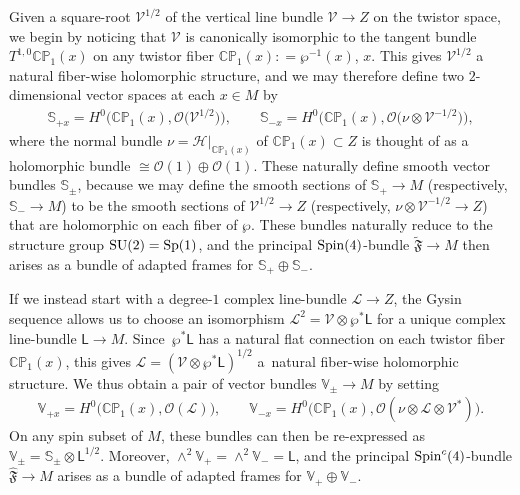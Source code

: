 \documentclass[pdftex]{sigma}
\numberwithin{equation}{section}
\def\CP{\mathbb{CP}}
\begin{document}
Given a square-root $\mathscr{V}^{1/2}$ of the vertical line bundle $\mathscr{V}\to Z$ on the twistor space,
we begin by noticing that $\mathscr{V}$ is canonically isomorphic to the tangent bundle $T^{1,0} \CP_1(x)$
on any twistor fiber $\CP_1 (x) : = \wp^{-1} (x)$, $x$. This gives $\mathscr{V}^{1/2}$ a natural fiber-wise
holomorphic structure, and we may therefore define two $2$-dimensional vector spaces at each $x\in M$ by
\begin{gather*}
{ \mathbb{S}}_{+{ x}}= H^0 \big({ \CP_{1}}({ x}) , \mathcal{O} \big(\mathscr{V}^{1/2}\big) \big), \qquad
{ \mathbb{S}}_{-{ x}}= H^0 \big({ \CP_{1}}({ x}) , \mathcal{O} \big({ \nu} \otimes \mathscr{V}^{-1/2}\big)\big),
\end{gather*}
where the normal bundle $\nu = \mathscr{H}|_{\CP_1 (x)}$ of $\CP_1(x) \subset Z$ is thought of as a holomorphic bundle $\cong \mathcal{O}(1) \oplus \mathcal{O}(1) $.
These naturally define smooth vector bundles $\mathbb{S}_\pm$, because we
may define the smooth sections of $\mathbb{S}_+\to M$ (respectively, $\mathbb{S}_-\to M$)
to be the smooth sections of $\mathscr{V}^{1/2}\to Z$
(respectively, ${ \nu} \otimes \mathscr{V}^{-1/2}\to Z$) that are holomorphic on each fiber of $\wp$.
These bundles naturally reduce to the structure group ${\rm SU}(2)={\rm Sp}(1)$, and the principal ${\rm Spin}(4)$-bundle
$\widetilde{\mathfrak{F}}\to M$ then arises as a bundle of adapted frames for $\mathbb{S}_+\oplus \mathbb{S}_-$.

If we instead start with a degree-$1$ complex line-bundle $\mathscr{L}\to Z$, the Gysin sequence allows us to choose an isomorphism
$\mathscr{L}^2= \mathscr{V}\otimes \wp^*\mathsf{L}$ for
a unique complex line-bundle $\mathsf{L}\to M$. Since~$\wp^*\mathsf{L}$ has a natural flat connection on each twistor fiber $\CP_1(x)$,
this gives ${ \mathscr{L}}= (\mathscr{V}\otimes \wp^*\mathsf{L})^{1/2}$ a~natural fiber-wise holomorphic structure.
We thus obtain a pair of vector bundles $\mathbb{V}_\pm \to M$ by setting
\begin{gather*}
{ \mathbb{V}}_{+{ x}}= H^0 \big({ \CP_{1}}({ x}) , \mathcal{O} ({ \mathscr{L}})\big), \qquad
{ \mathbb{V}}_{-{ x}}= H^0 \big({ \CP_{1}}({ x}) , \mathcal{O} ({ \nu} \otimes { \mathscr{L}}
\otimes {\mathscr{V}^*})\big).
\end{gather*}
On any spin subset of $M$, these bundles
can then be re-expressed as
$\mathbb{V}_\pm = \mathbb{S}_\pm\otimes \mathsf{L}^{1/2}$.
Moreover, $\wedge^2 \mathbb{V}_+ = \wedge^2 \mathbb{V}_-= \mathsf{L}$, and the principal
${\rm Spin}^c(4)$-bundle $\widehat{\mathfrak{F}}\to M$ arises as a bundle of adapted frames for $\mathbb{V}_+\oplus \mathbb{V}_-$.
\end{document}
